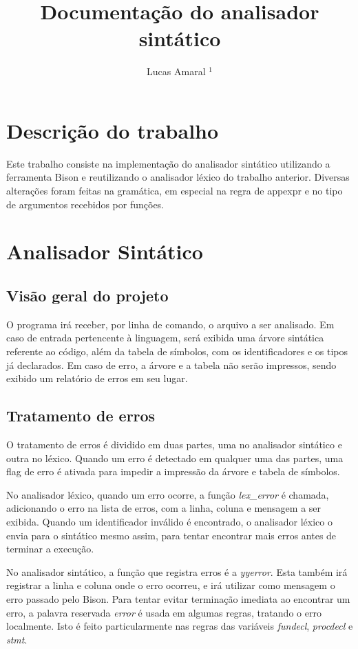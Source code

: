 \documentclass[11pt]{article}
\title{Documentação do analisador sintático}
\author{Lucas Amaral $^1$}
\begin{document}
\maketitle


\section{Descrição do trabalho}

Este trabalho consiste na implementação do analisador sintático utilizando a ferramenta Bison e reutilizando o analisador léxico do trabalho anterior.
Diversas alterações foram feitas na gramática, em especial na regra de appexpr e no tipo de argumentos recebidos por funções.

\section{Analisador Sintático}

\subsection{Visão geral do projeto}

O programa irá receber, por linha de comando, o arquivo a ser analisado. 
Em caso de entrada pertencente à linguagem, será exibida uma árvore sintática referente ao código,
além da tabela de símbolos, com os identificadores e os tipos já declarados.
Em caso de erro, a árvore e a tabela não serão impressos, sendo exibido um relatório de erros em seu lugar.

\subsection{Tratamento de erros}

O tratamento de erros é dividido em duas partes, uma no analisador sintático e outra no léxico.
Quando um erro é detectado em qualquer uma das partes, uma flag de erro é ativada para impedir
a impressão da árvore e tabela de símbolos.

No analisador léxico, quando um erro ocorre, a função \emph{lex\_error} é chamada, adicionando o erro na lista de erros,
com a linha, coluna e mensagem a ser exibida. Quando um identificador inválido é encontrado, o analisador léxico
o envia para o sintático mesmo assim, para tentar encontrar mais erros antes de terminar a execução.

No analisador sintático, a função que registra erros é a \emph{yyerror}. Esta também irá registrar a linha e coluna
onde o erro ocorreu, e irá utilizar como mensagem o erro passado pelo Bison.
Para tentar evitar terminação imediata ao encontrar um erro, a palavra reservada \emph{error} é usada em algumas regras,
tratando o erro localmente. Isto é feito particularmente nas regras das variáveis \emph{fundecl}, \emph{procdecl} e \emph{stmt}.   
\end{document}
